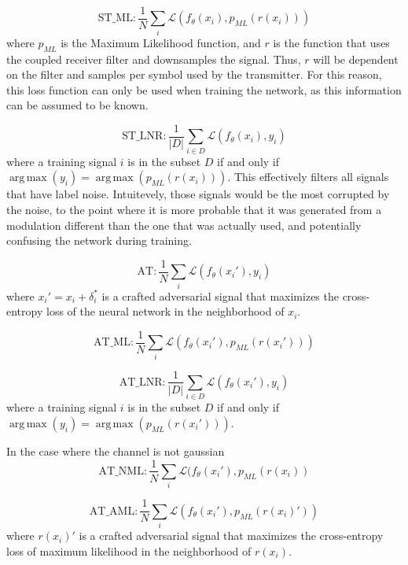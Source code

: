\documentclass[conference]{IEEEtran}
\newcommand{\Ls}{\mathcal{L}}
\DeclareMathOperator*{\argmax}{arg\,max}
\begin{document}
\begin{equation}
    \text{ST\_ML} : \dfrac{1}{N}\sum_{i}\Ls(f_{\theta}(x_i), p_{ML}(r(x_i)))
\end{equation}
where $p_{ML}$ is the Maximum Likelihood function, and $r$ is the function that uses the coupled receiver filter and downsamples the signal. Thus, $r$ will be dependent on the filter and samples per symbol used by the transmitter. For this reason, this loss function can only be used when training the network, as this information can be assumed to be known.

\begin{equation}
    \text{ST\_LNR} : \dfrac{1}{|D|}\sum_{i \in D}\Ls(f_{\theta}(x_i), y_i)
\end{equation}
where a training signal $i$ is in the subset $D$ if and only if $\argmax(y_i) = \argmax(p_{ML}(r(x_i)))$. This effectively filters all signals that have label noise. Intuitevely, those signals would be the most corrupted by the noise, to the point where it is more probable that it was generated from a modulation different than the one that was actually used, and potentially confusing the network during training.

\begin{equation}
    \text{AT} : \dfrac{1}{N}\sum_{i}\Ls(f_{\theta}(x_i'), y_i)
\end{equation}
where $x_i' = x_i + \delta_i^*$ is a crafted adversarial signal that maximizes the cross-entropy loss of the neural network in the neighborhood of $x_i$.

\begin{equation}
    \text{AT\_ML} : \dfrac{1}{N}\sum_{i}\Ls(f_{\theta}(x_i'), p_{ML}(r(x_i')))
\end{equation}

\begin{equation}
    \text{AT\_LNR} : \dfrac{1}{|D|}\sum_{i \in D}\Ls(f_{\theta}(x_i'), y_i)
\end{equation}
where a training signal $i$ is in the subset $D$ if and only if $\argmax(y_i) = \argmax(p_{ML}(r(x_i')))$.

In the case where the channel is not gaussian
\begin{equation}
    \text{AT\_NML} : \dfrac{1}{N}\sum_{i}\Ls(f_{\theta}(x_i'), p_{ML}(r(x_i))
\end{equation}

\begin{equation}
    \text{AT\_AML} : \dfrac{1}{N}\sum_{i}\Ls(f_{\theta}(x_i'), p_{ML}(r(x_i)'))
\end{equation}
where $r(x_i)'$ is a crafted adversarial signal that maximizes the cross-entropy loss of maximum likelihood in the neighborhood of $r(x_i)$.
\end{document}

